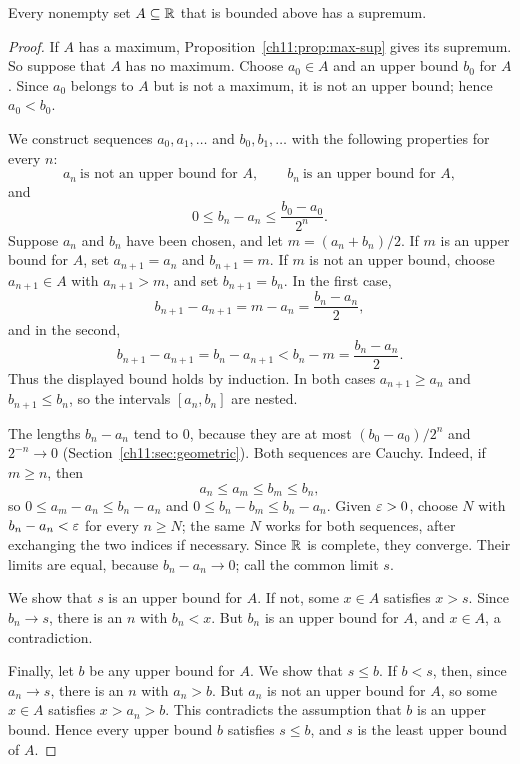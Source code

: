 \par\noindent\begin{minipage}{\linewidth}
\begin{theorem}\label{ch11:thm:lub}
Every nonempty set $A\subseteq\mathbb R$ that is bounded above has a supremum.
\end{theorem}
\end{minipage}\par

\begin{proof}
If $A$ has a maximum, Proposition~\ref{ch11:prop:max-sup} gives its supremum. So suppose that $A$ has no maximum. Choose $a_0\in A$ and an upper bound $b_0$ for $A$. Since $a_0$ belongs to $A$ but is not a maximum, it is not an upper bound; hence $a_0<b_0$.

We construct sequences $a_0,a_1,\ldots$ and $b_0,b_1,\ldots$ with the following properties for every $n$:
\[
a_n\ \text{is not an upper bound for }A,\qquad b_n\ \text{is an upper bound for }A,
\]
and
\[
0\le b_n-a_n\le\frac{b_0-a_0}{2^n}.
\]
Suppose $a_n$ and $b_n$ have been chosen, and let $m=(a_n+b_n)/2$. If $m$ is an upper bound for $A$, set $a_{n+1}=a_n$ and $b_{n+1}=m$. If $m$ is not an upper bound, choose $a_{n+1}\in A$ with $a_{n+1}>m$, and set $b_{n+1}=b_n$. In the first case,
\[
b_{n+1}-a_{n+1}=m-a_n=\frac{b_n-a_n}{2},
\]
and in the second,
\[
b_{n+1}-a_{n+1}=b_n-a_{n+1}<b_n-m=\frac{b_n-a_n}{2}.
\]
Thus the displayed bound holds by induction. In both cases $a_{n+1}\ge a_n$ and $b_{n+1}\le b_n$, so the intervals $[a_n,b_n]$ are nested.

The lengths $b_n-a_n$ tend to $0$, because they are at most $(b_0-a_0)/2^n$ and $2^{-n}\to0$ (Section~\ref{ch11:sec:geometric}). Both sequences are Cauchy. Indeed, if $m\ge n$, then
\[
a_n\le a_m\le b_m\le b_n,
\]
so $0\le a_m-a_n\le b_n-a_n$ and $0\le b_n-b_m\le b_n-a_n$. Given $\varepsilon>0$, choose $N$ with $b_n-a_n<\varepsilon$ for every $n\ge N$; the same $N$ works for both sequences, after exchanging the two indices if necessary. Since $\mathbb R$ is complete, they converge. Their limits are equal, because $b_n-a_n\to0$; call the common limit $s$.

We show that $s$ is an upper bound for $A$. If not, some $x\in A$ satisfies $x>s$. Since $b_n\to s$, there is an $n$ with $b_n<x$. But $b_n$ is an upper bound for $A$, and $x\in A$, a contradiction.

Finally, let $b$ be any upper bound for $A$. We show that $s\le b$. If $b<s$, then, since $a_n\to s$, there is an $n$ with $a_n>b$. But $a_n$ is not an upper bound for $A$, so some $x\in A$ satisfies $x>a_n>b$. This contradicts the assumption that $b$ is an upper bound. Hence every upper bound $b$ satisfies $s\le b$, and $s$ is the least upper bound of $A$.
\end{proof}

